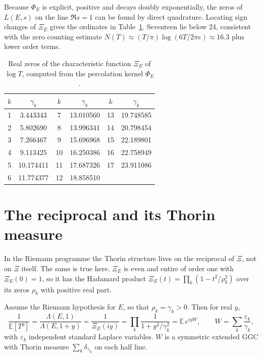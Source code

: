 Because $\Phi_E$ is explicit, positive and decays doubly exponentially, the zeros of $L(E,s)$ on the line $\Re s = 1$ can be found by direct quadrature. Locating sign changes of $\Xi_E$ gives the ordinates in Table~\ref{perc:tab:zeros}. Seventeen lie below 24, consistent with the zero counting estimate $N(T)\approx(T/\pi)\log(6T/2\pi e)\approx16.3$ plus lower order terms.

\begin{table}[h]
\centering
\begin{tabular}{cccccc}
\toprule
$k$ & $\gamma_k$ & $k$ & $\gamma_k$ & $k$ & $\gamma_k$\\
\midrule
1 & 3.443343 & 7 & 13.010560 & 13 & 19.748585\\
2 & 5.802690 & 8 & 13.996341 & 14 & 20.798454\\
3 & 7.266467 & 9 & 15.696968 & 15 & 22.189801\\
4 & 9.113425 & 10 & 16.250386 & 16 & 22.758949\\
5 & 10.174411 & 11 & 17.687326 & 17 & 23.911086\\
6 & 11.774377 & 12 & 18.858510 & & \\
\bottomrule
\end{tabular}
\caption{Real zeros of the characteristic function $\Xi_E$ of $\log T$, computed from the percolation kernel $\Phi_E$.}
\label{perc:tab:zeros}
\end{table}

\section{The reciprocal and its Thorin measure}

In the Riemann programme \cite{polson2018vdp} the Thorin structure lives on the reciprocal of $\Xi$, not on $\Xi$ itself. The same is true here. $\Xi_E$ is even and entire of order one with $\Xi_E(0) = 1$, so it has the Hadamard product $\Xi_E(t) = \prod_k(1-t^2/\rho_k^2)$ over its zeros $\rho_k$ with positive real part.

\begin{corollary}\label{perc:cor:recip}
Assume the Riemann hypothesis for $E$, so that $\rho_k = \gamma_k>0$. Then for real $y$,
\[
\frac{1}{\mathbb{E}[T^y]} = \frac{\Lambda(E,1)}{\Lambda(E,1+y)} = \frac{1}{\Xi_E(iy)} = \prod_k\frac{1}{1+y^2/\gamma_k^2} = \mathbb{E}\,e^{iyW},
\qquad W = \sum_k\frac{\varepsilon_k}{\gamma_k},
\]
with $\varepsilon_k$ independent standard Laplace variables. $W$ is a symmetric extended GGC with Thorin measure $\sum_k\delta_{\gamma_k}$ on each half line.
\end{corollary}

